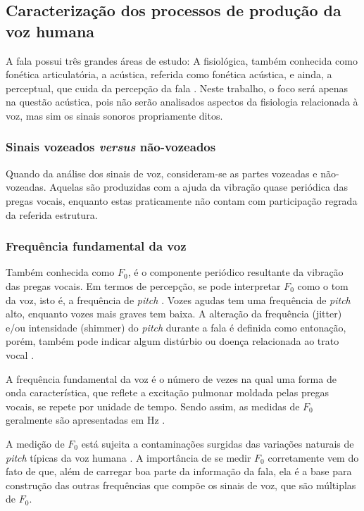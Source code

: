 		\subsection{Caracterização dos processos de produção da voz humana}
			\par A fala possui três grandes áreas de estudo: A fisiológica, também conhecida como fonética articulatória, a acústica, referida como fonética acústica, e ainda, a perceptual, que cuida da percepção  da  fala \cite{kremer2014eficiencia}. Neste trabalho, o foco será apenas na questão acústica, pois não serão analisados aspectos da fisiologia relacionada à voz, mas sim os sinais sonoros propriamente ditos.
		
		\subsubsection{Sinais vozeados \textit{versus} não-vozeados}
			\par Quando da análise dos sinais de voz, consideram-se as partes vozeadas e não-vozeadas. Aquelas são produzidas com a ajuda da vibração quase periódica das pregas vocais, enquanto estas praticamente não contam com participação regrada da referida estrutura.
		
		\subsubsection{Frequência fundamental da voz}
			\par Também conhecida como $F_0$, é o componente periódico resultante da vibração das pregas vocais. Em termos de percepção, se pode interpretar $F_0$ como o tom da voz, isto é, a frequência de \textit{pitch} \cite{kremer2014eficiencia}. Vozes agudas tem uma frequência de \textit{pitch} alto, enquanto vozes mais graves tem baixa. A alteração da frequência (jitter) e/ou intensidade (shimmer) do \textit{pitch} durante a fala é definida como entonação,  porém, também pode indicar algum distúrbio ou doença relacionada ao trato vocal \cite{WERTZNER2005}.
			
			\par A frequência fundamental da voz é o número de vezes na qual uma forma de onda característica, que reflete a excitação pulmonar moldada pelas pregas vocais, se repete por unidade de tempo. Sendo assim, as medidas de $F_0$ geralmente são apresentadas em Hz \cite{freitas2013avaliaccao}.
			
			\par A medição de $F_0$ está sujeita a contaminações surgidas das variações naturais de \textit{pitch} típicas da voz humana \cite{freitas2013avaliaccao}. A importância de se medir $F_0$ corretamente vem do fato de que, além de carregar boa parte da informação da fala, ela é a base para construção das outras frequências que compõe os sinais de voz, que são múltiplas de $F_0$.
		
